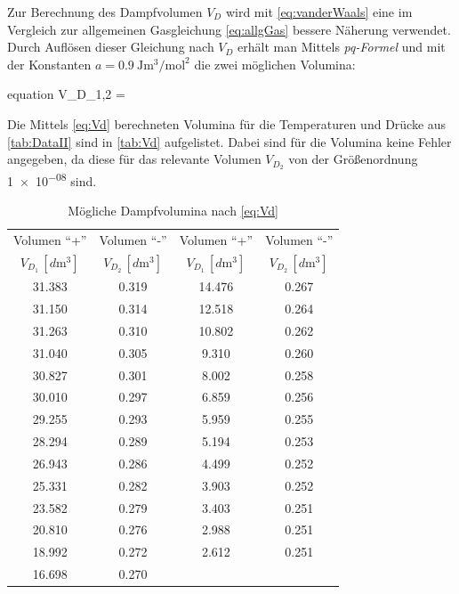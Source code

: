 	Zur Berechnung des Dampfvolumen $V_{D}$ wird mit \eqref{eq:vanderWaals} eine im Vergleich zur allgemeinen Gasgleichung
	\eqref{eq:allgGas} bessere Näherung verwendet. Durch Auflösen dieser Gleichung nach $V_{D}$ erhält man Mittels \emph{pq-Formel} 
	und mit der Konstanten 
	$ a = \SI{0.9}{\joule\cubic\meter\per\mole\squared}$ \cite{V203} 
	die zwei möglichen Volumina:
	\begin{empheq}{equation}
		V_{D_{1,2}} =  \pm {}
		\label{eq:Vd}
	\end{empheq} 
	Die Mittels \eqref{eq:Vd} berechneten Volumina für die Temperaturen und Drücke aus \autoref{tab:DataII} sind in \autoref{tab:Vd}
	aufgelistet. Dabei sind für die Volumina keine Fehler angegeben, da diese für das relevante Volumen $V_{D_{2}}$ von der Größenordnung
	\num{1e-08} sind.
	
	\begin{table}
		\centering
		\begin{tabular}{|c|c||c|c|}
			\hline
			Volumen \enquote{+} & Volumen \enquote{-} & Volumen \enquote{+} & Volumen \enquote{-}\\
			$V_{D_{1}}\,[\si{d\meter\cubed}]$  & $V_{D_{2}}\,[\si{d\meter\cubed}]$ & $V_{D_{1}}\,[\si{d\meter\cubed}]$  & $V_{D_{2}}\,[\si{d\meter\cubed}]$ \\ \hline\hline
			\num{31.383}  & \num{0.319} & \num{14.476}  & \num{0.267} \\
			\num{31.150}  & \num{0.314} &\num{12.518}  & \num{0.264} \\
			\num{31.263}  & \num{0.310} &\num{10.802}  & \num{0.262} \\
			\num{31.040}  & \num{0.305} &\num{9.310}  & \num{0.260} \\
			\num{30.827}  & \num{0.301} &\num{8.002}  & \num{0.258} \\
			\num{30.010}  & \num{0.297} &\num{6.859}  & \num{0.256} \\
			\num{29.255}  & \num{0.293} &\num{5.959}  & \num{0.255} \\
			\num{28.294}  & \num{0.289} &\num{5.194}  & \num{0.253} \\
			\num{26.943}  & \num{0.286} &\num{4.499}  & \num{0.252} \\
			\num{25.331}  & \num{0.282} &\num{3.903}  & \num{0.252} \\
			\num{23.582}  & \num{0.279} &\num{3.403}  & \num{0.251} \\
			\num{20.810}  & \num{0.276} &\num{2.988}  & \num{0.251} \\
			\num{18.992}  & \num{0.272} &\num{2.612}  & \num{0.251} \\
			\num{16.698}  & \num{0.270} & & \\
			\hline
		\end{tabular}
		\caption{Mögliche Dampfvolumina nach \eqref{eq:Vd} \label{tab:Vd}}
	\end{table}
	
